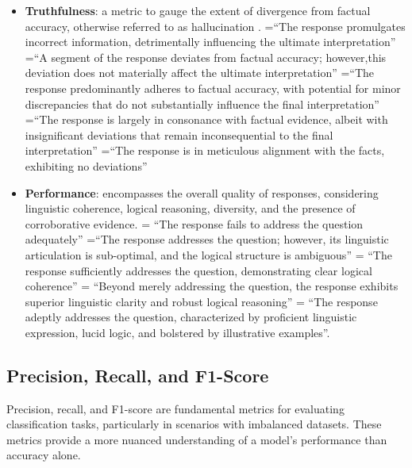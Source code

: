                 \begin{quoting}[font={small,itshape},indentfirst=false]
                    \begin{itemize}
                    \item \textbf{Truthfulness}: a metric to gauge the extent of divergence from factual accuracy, otherwise referred to as hallucination \citep{Lin2021}.
                        =“The response promulgates incorrect information, detrimentally influencing the ultimate interpretation”
                        =“A segment of the response deviates from factual accuracy; however,this deviation does not materially affect the ultimate interpretation”
                        =“The response predominantly adheres to factual accuracy, with potential for minor discrepancies that do not substantially influence the final interpretation”
                        =“The response is largely in consonance with factual evidence, albeit with insignificant deviations that remain inconsequential to the final interpretation”
                        =“The response is in meticulous alignment with the facts, exhibiting no deviations”
                                
                    \item \textbf{Performance}: encompasses the overall quality of responses, considering linguistic coherence, logical reasoning, diversity, and the presence of corroborative evidence.
                         = “The response fails to address the question adequately”
                         =“The response addresses the question; however, its linguistic articulation is sub-optimal, and the logical structure is ambiguous”
                         = “The response sufficiently addresses the question, demonstrating clear logical coherence”
                         = “Beyond merely addressing the question, the response exhibits superior linguistic clarity and robust logical reasoning”
                         = “The response adeptly addresses the question, characterized by proficient linguistic expression, lucid logic, and bolstered by illustrative examples”\citep{Lin2021}.         
                    \end{itemize}
                \end{quoting}

            \subsection{Precision, Recall, and F1-Score}
                Precision, recall, and F1-score are fundamental metrics for evaluating classification tasks, particularly in scenarios with imbalanced datasets. These metrics provide a more nuanced understanding of a model's performance than accuracy alone.


